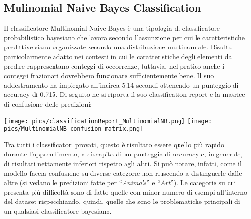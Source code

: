 \documentclass[12pt,oneside]{article}
\begin{document}
    \begin{enumerate}
    \subsection{Mulinomial Naive Bayes Classification}
    \begin{justify}
        Il classificatore Multinomial Naive Bayes è una tipologia di classificatore probabilistico bayesiano che lavora secondo l’assunzione per cui le caratteristiche predittive siano organizzate secondo una distribuzione multinomiale. Risulta particolarmente adatto nei contesti in cui le caratteristiche degli elementi da predire rappresentano conteggi di occorrenze, tuttavia, nel pratico anche i conteggi frazionari dovrebbero funzionare sufficientemente bene.
        Il suo addestramento ha impiegato all’incirca 5.14 secondi ottenendo un punteggio di accuracy di 0.715. 
        Di seguito ne si riporta il suo classification report e la matrice di confusione delle predizioni:
    \end{justify}
    \texttt{[image: pics/classificationReport\_MultinomialNB.png]} 
    \texttt{[image: pics/MultinomialNB\_confusion\_matrix.png]}

    \begin{justify}
        Tra tutti i classificatori provati, questo è risultato essere quello più rapido durante l’apprendimento, a discapito di un punteggio di accuracy e, in generale, di risultati nettamente inferiori rispetto agli altri. Si può notare, infatti, come il modello faccia confusione su diverse categorie non riuscendo a distinguerle dalle altre (si vedano le predizioni fatte per “\textit{Animals}” e “\textit{Art}”). Le categorie su cui presenta più difficoltà sono di fatto quelle con minor numero di esempi all’interno del dataset rispecchiando, quindi, quelle che sono le problematiche principali di un qualsiasi classificatore bayesiano.
    \end{justify}
    \end{enumerate}
    
\end{document}
